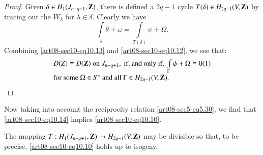 \begin{proof}
Given $\delta\in H_{1}(J_{n-q+1},\mathbf{Z})$, there is defined a $2q-1$ cycle $T(\delta)\in H_{2q-1}(V,\mathbf{Z})$ by tracing out the $W_{\lambda}$ for $\lambda\in \delta$. Clearly we have
\begin{equation}
\int\limits_{\delta}\theta+\omega=\int\limits_{T(\delta)}\psi+\Omega.\label{art08-sec10-eq10.13}
\end{equation}
Combining \eqref{art08-sec10-eq10.13} and \eqref{art08-sec10-eq10.12}, we see that:
\begin{equation}
\begin{array}{l}
D(Z)\equiv D(\mathbf{Z})\text{ on } J_{n-q+1},\text{ if, and only if, } \int\limits_{\Gamma}\psi+\Omega\equiv 0(1)\\
\text{for some } \Omega\in S^{*} \text{ and all } \Gamma\in H_{2q-1}(V,\mathbf{Z}).
\end{array}\label{art08-sec10-eq10.14}
\end{equation}
\end{proof}

Now taking into account the reciprocity relation \eqref{art08-sec5-eq5.30}, we find that \eqref{art08-sec10-eq10.14} implies \eqref{art08-sec10-eq10.10}.

\begin{remark*}
The mapping $T:H_{1}(J_{n-q+1},\mathbf{Z})\to H_{2q-1}(V,\mathbf{Z})$ may be divisible so that, to be precise, \eqref{art08-sec10-eq10.10} holds up to isogeny.
\end{remark*}

